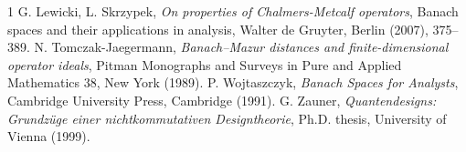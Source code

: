 \documentclass[12pt, reqno]{amsart}
\theoremstyle{definition}
\theoremstyle{remark}
\numberwithin{equation}{section}
\begin{document}
\begin{thebibliography}{1}
 G. Lewicki, L. Skrzypek, \emph{On properties of Chalmers-Metcalf operators}, Banach spaces and their applications in analysis, Walter de Gruyter, Berlin (2007), 375--389.
 N. Tomczak-Jaegermann, \emph{Banach--Mazur distances and finite-dimensional operator ideals}, Pitman Monographs and Surveys in Pure and Applied Mathematics 38, New York (1989).
 P. Wojtaszczyk, \emph{Banach Spaces for Analysts}, Cambridge University Press, Cambridge (1991).
  G. Zauner, \emph{Quantendesigns: Grundz\"uge einer nichtkommutativen Designtheorie}, Ph.D. thesis, University of Vienna (1999).
\end{thebibliography}
\end{document}
